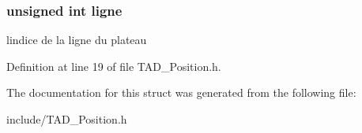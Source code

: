\subsubsection[{ligne}]{\setlength{\rightskip}{0pt plus 5cm}unsigned int ligne}\label{struct_position_a90d401bbcd8cccd70cbe1b638ba239cf}
l\textquotesingle{}indice de la ligne du plateau 

Definition at line 19 of file T\+A\+D\+\_\+\+Position.\+h.



The documentation for this struct was generated from the following file\+:\begin{DoxyCompactItemize}
\item 
include/T\+A\+D\+\_\+\+Position.\+h\end{DoxyCompactItemize}
